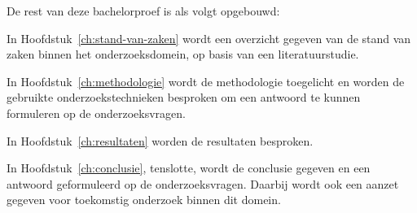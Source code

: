 
De rest van deze bachelorproef is als volgt opgebouwd:

In Hoofdstuk~\ref{ch:stand-van-zaken} wordt een overzicht gegeven van de stand van zaken binnen het onderzoeksdomein, op basis van een literatuurstudie.

In Hoofdstuk~\ref{ch:methodologie} wordt de methodologie toegelicht en worden de gebruikte onderzoekstechnieken besproken om een antwoord te kunnen formuleren op de onderzoeksvragen.

In Hoofdstuk~\ref{ch:resultaten} worden de resultaten besproken.

In Hoofdstuk~\ref{ch:conclusie}, tenslotte, wordt de conclusie gegeven en een antwoord geformuleerd op de onderzoeksvragen. Daarbij wordt ook een aanzet gegeven voor toekomstig onderzoek binnen dit domein.